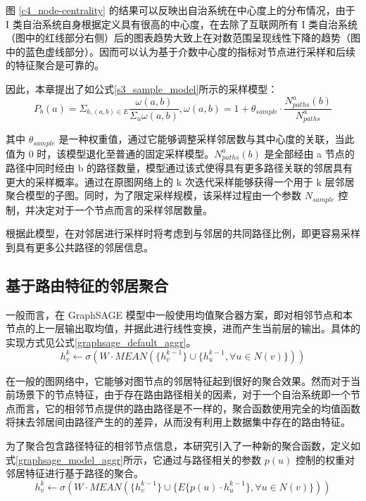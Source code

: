 图 \ref{c4_node-centrality} 的结果可以反映出自治系统在中心度上的分布情况，由于 I 类自治系统自身根据定义具有很高的中心度，在去除了互联网所有 I 类自治系统（图中的红线部分右侧）后的图表趋势大致上在对数范围呈现线性下降的趋势（图中的蓝色虚线部分）。因而可以认为基于介数中心度的指标对节点进行采样和后续的特征聚合是可靠的。

因此，本章提出了如公式\ref{s3_sample_model}所示的采样模型：
\begin{equation} \label{s3_sample_model}
P_b(a) = \Sigma_{b, (a,b) \in E} \frac{\omega(a,b)}{\Sigma_{a} \omega(a,b)}, \omega(a,b) = 1 + \theta_{sample} \cdot \frac{N_{paths}^a(b)}{N_{paths}^a}
\end{equation}

其中 $\theta_{sample}$ 是一种权重值，通过它能够调整采样邻居数与其中心度的关联，当此值为 0 时，该模型退化至普通的固定采样模型。$N_{paths}^a(b)$ 是全部经由 a 节点的路径中同时经由 b 的路径数量，模型通过该式使得具有更多路径关联的邻居具有更大的采样概率。通过在原图网络上的 k 次迭代采样能够获得一个用于 k 层邻居聚合模型的子图。同时，为了限定采样规模，该采样过程由一个参数 $N_{sample}$ 控制，并决定对于一个节点而言的采样邻居数量。

根据此模型，在对邻居进行采样时将考虑到与邻居的共同路径比例，即更容易采样到具有更多公共路径的邻居信息。

\subsection{基于路由特征的邻居聚合}

一般而言，在 GraphSAGE 模型中一般使用均值聚合器方案，即对相邻节点和本节点的上一层输出取均值，并据此进行线性变换，进而产生当前层的输出。具体的实现方式见公式\ref{graphsage_default_aggr}。
\begin{equation} \label{graphsage_default_aggr}
h^k_v \leftarrow \sigma(W \cdot MEAN(\{h_v^{k-1}\}\cup \{h^{k-1}_u, \forall u \in N(v)\}))
\end{equation}

在一般的图网络中，它能够对图节点的邻居特征起到很好的聚合效果。然而对于当前场景下的节点特征，由于存在路由路径相关的因素，对于一个自治系统即一个节点而言，它的相邻节点提供的路由路径是不一样的，聚合函数使用完全的均值函数将抹去邻居间由路径产生的的差异，从而没有利用上数据集中存在的路由特征。

为了聚合包含路径特征的相邻节点信息，本研究引入了一种新的聚合函数，定义如式\ref{graphsage_model_aggr}所示，它通过与路径相关的参数 $p(u)$ 控制的权重对邻居特征进行基于路径的聚合。
\begin{equation} \label{graphsage_model_aggr}
h^k_v \leftarrow \sigma(W \cdot MEAN(\{h_v^{k-1}\} \cup \{E\{p(u) \cdot h^{k-1}_u\}, \forall u \in N(v)\}))
\end{equation}

